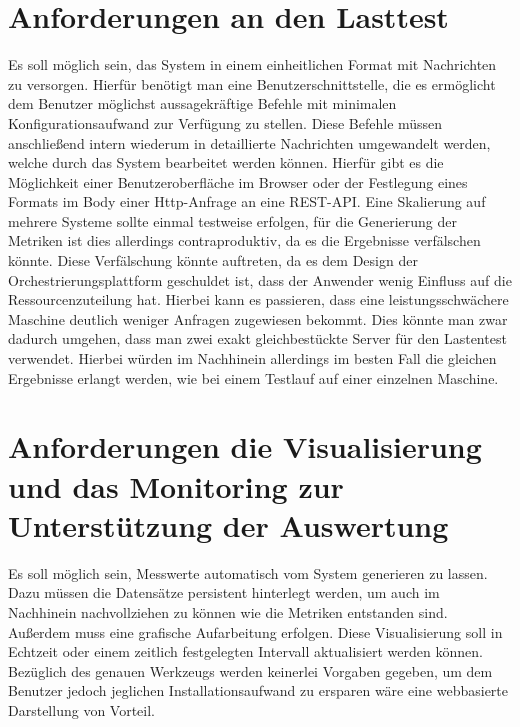 \section{Anforderungen an den Lasttest}
Es soll möglich sein, das System in einem einheitlichen Format mit Nachrichten zu versorgen. Hierfür benötigt man eine Benutzerschnittstelle, die es ermöglicht dem Benutzer möglichst aussagekräftige Befehle mit minimalen Konfigurationsaufwand zur Verfügung zu stellen. Diese Befehle müssen anschließend intern wiederum in detaillierte Nachrichten umgewandelt werden, welche durch das System bearbeitet werden können. Hierfür gibt es die Möglichkeit einer Benutzeroberfläche im Browser oder der Festlegung eines Formats im Body einer Http-Anfrage an eine REST-API. Eine Skalierung auf mehrere Systeme sollte einmal testweise erfolgen, für die Generierung der Metriken ist dies allerdings contraproduktiv, da es die Ergebnisse verfälschen könnte. Diese Verfälschung könnte auftreten, da es dem Design der Orchestrierungsplattform geschuldet ist, dass der Anwender wenig Einfluss auf die Ressourcenzuteilung hat. Hierbei kann es passieren, dass eine leistungsschwächere Maschine deutlich weniger Anfragen zugewiesen bekommt. Dies könnte man zwar dadurch umgehen, dass man zwei exakt gleichbestückte Server für den Lastentest verwendet. Hierbei würden im Nachhinein allerdings im besten Fall die gleichen Ergebnisse erlangt werden, wie bei einem Testlauf auf einer einzelnen Maschine.

\section{Anforderungen die Visualisierung und das Monitoring zur Unterstützung der Auswertung}
Es soll möglich sein, Messwerte automatisch vom System generieren zu lassen. Dazu müssen die Datensätze persistent hinterlegt werden, um auch im Nachhinein nachvollziehen zu können wie die Metriken entstanden sind. Außerdem muss eine grafische Aufarbeitung erfolgen. Diese Visualisierung soll in Echtzeit oder einem zeitlich festgelegten Intervall aktualisiert werden können. Bezüglich des genauen Werkzeugs werden keinerlei Vorgaben gegeben, um dem Benutzer jedoch jeglichen Installationsaufwand zu ersparen wäre eine webbasierte Darstellung von Vorteil.
